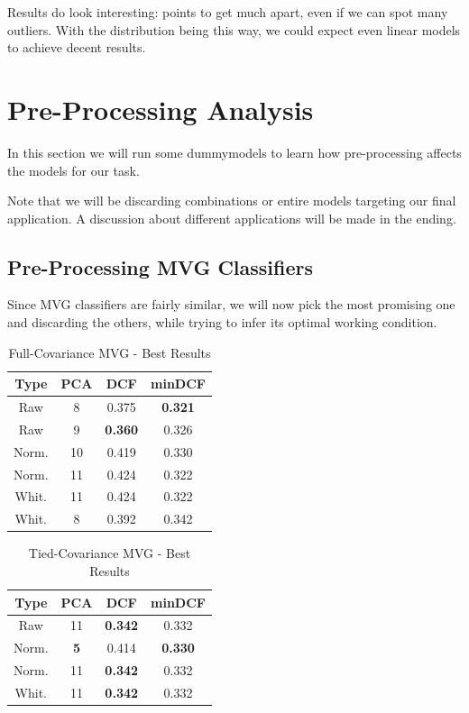 \documentclass[12pt, twocolumn]{article}
\begin{document}
Results do look interesting: points to get much apart, even if we can spot many outliers.
With the distribution being this way, we could expect even linear models to achieve decent results.


\section{Pre-Processing Analysis}

In this section we will run some dummy\footnotemark models to learn how pre-processing affects the models for our task.

Note that we will be discarding combinations or entire models targeting our final application.
A discussion about different applications will be made in the ending.

\subsection{Pre-Processing MVG Classifiers}

Since MVG classifiers are fairly similar, 
we will now pick the most promising one and discarding the others, 
while trying to infer its optimal working condition.

\begin{table}[H] 
    \centering
    \begin{tabular}{||c|c|c|c||}
        \hline
        Type & PCA & DCF & minDCF \\
        \hline
        \hline
        Raw   & 8  & 0.375 & {\bf 0.321} \\
        Raw   & 9  & {\bf 0.360} & 0.326 \\
        Norm. & 10 & 0.419 & 0.330 \\
        Norm. & 11 & 0.424 & 0.322 \\
        Whit. & 11 & 0.424 & 0.322 \\
        Whit. & 8  & 0.392 & 0.342 \\
        \hline
    \end{tabular}
    \caption{Full-Covariance MVG - Best Results}
    \label{fullcovtab}
\end{table}

    
\begin{table}[H] 
    \centering
    \begin{tabular}{||c|c|c|c||}
        \hline
        Type & PCA & DCF & minDCF \\
        \hline
        \hline
        Raw   & 11 & {\bf 0.342} & 0.332 \\
        Norm. & {\bf 5}  & 0.414 & {\bf 0.330} \\
        Norm. & 11 & {\bf 0.342} & 0.332 \\
        Whit. & 11 & {\bf 0.342} & 0.332 \\
        \hline
    \end{tabular}
    \caption{Tied-Covariance MVG - Best Results}
    \label{tiedcovtab}
\end{table}
\end{document}
